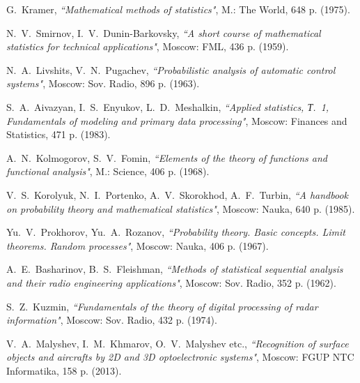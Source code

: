 \documentclass[
11pt,%
tightenlines,%
twoside,%
onecolumn,%
nofloats,%
nobibnotes,%
nofootinbib,%
superscriptaddress,%
noshowpacs,%
centertags]%
{revtex4}
\begin{document}
\begin{thebibliography}{99}
G.~Kramer, {\it ``Mathematical methods of statistics"}, M.: The World, 648 p. (1975).

N.~V.~Smirnov, I.~V.~Dunin-Barkovsky, {\it ``A short course of mathematical statistics for technical applications"}, Moscow: FML, 436 p. (1959).

N.~A.~Livshits, V.~N.~Pugachev, {\it ``Probabilistic analysis of automatic control systems"}, Moscow: Sov. Radio, 896 p. (1963).

S.~A.~Aivazyan, I.~S.~Enyukov, L.~D.~Meshalkin, {\it ``Applied statistics, Т.~1, Fundamentals of modeling and primary data processing"},  Moscow: Finances and Statistics, 471 p. (1983).

A.~N.~Kolmogorov, S.~V.~Fomin, {\it ``Elements of the theory of functions and functional analysis"}, M.: Science, 406 p. (1968).

V.~S.~Korolyuk, N.~I.~Portenko, A.~V.~Skorokhod, A.~F.~Turbin, {\it ``A handbook on probability theory and mathematical statistics"}, Moscow: Nauka, 640 p. (1985).

Yu.~V.~Prokhorov, Yu.~A.~Rozanov, {\it ``Probability theory. Basic concepts. Limit theorems. Random processes"}, Moscow: Nauka, 406 p. (1967).

A.~E.~Basharinov, B.~S.~Fleishman, {\it ``Methods of statistical sequential analysis and their radio engineering applications"}, Moscow: Sov. Radio, 352 p. (1962).

S.~Z.~Kuzmin, {\it ``Fundamentals of the theory of digital processing of radar information"}, Moscow: Sov. Radio, 432 p. (1974).

V.~A.~Malyshev, I.~M.~Khmarov, O.~V.~Malyshev etc., {\it ``Recognition of surface objects and aircrafts by 2D and 3D optoelectronic systems"}, Moscow: FGUP NTC Informatika, 158 p. (2013).

\end{thebibliography}
\end{document}
